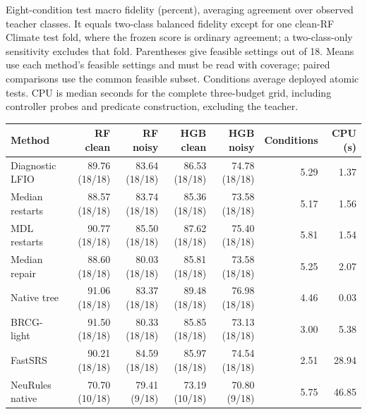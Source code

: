 \begin{kbtable}
\centering
\caption{Eight-condition test macro fidelity (percent), averaging agreement over observed teacher classes. It equals two-class balanced fidelity except for one clean-RF Climate test fold, where the frozen score is ordinary agreement; a two-class-only sensitivity excludes that fold. Parentheses give feasible settings out of 18. Means use each method's feasible settings and must be read with coverage; paired comparisons use the common feasible subset. Conditions average deployed atomic tests. CPU is median seconds for the complete three-budget grid, including controller probes and predicate construction, excluding the teacher.}
\label{tab:independent-main}
\small
\begin{adjustbox}{max width=\linewidth}
\begin{tabular}{lrrrrrr}
\toprule
Method & RF clean & RF noisy & HGB clean & HGB noisy & Conditions & CPU (s) \\
\midrule
Diagnostic LFIO & 89.76 (18/18) & 83.64 (18/18) & 86.53 (18/18) & 74.78 (18/18) & 5.29 & 1.37 \\
Median restarts & 88.57 (18/18) & 83.74 (18/18) & 85.36 (18/18) & 73.58 (18/18) & 5.17 & 1.56 \\
MDL restarts & 90.77 (18/18) & 85.50 (18/18) & 87.62 (18/18) & 75.40 (18/18) & 5.81 & 1.54 \\
Median repair & 88.60 (18/18) & 80.03 (18/18) & 85.81 (18/18) & 73.58 (18/18) & 5.25 & 2.07 \\
Native tree & 91.06 (18/18) & 83.37 (18/18) & 89.48 (18/18) & 76.98 (18/18) & 4.46 & 0.03 \\
BRCG-light & 91.50 (18/18) & 80.33 (18/18) & 85.85 (18/18) & 73.13 (18/18) & 3.00 & 5.38 \\
FastSRS & 90.21 (18/18) & 84.59 (18/18) & 85.97 (18/18) & 74.54 (18/18) & 2.51 & 28.94 \\
NeuRules native & 70.70 (10/18) & 79.41 (9/18) & 73.19 (10/18) & 70.80 (9/18) & 5.75 & 46.85 \\
\bottomrule
\end{tabular}
\end{adjustbox}
\end{kbtable}
